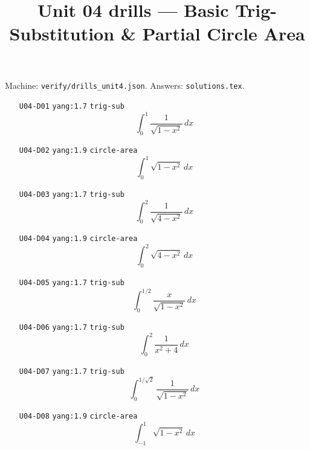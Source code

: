 
\title{Unit 04 drills --- Basic Trig-Substitution \& Partial Circle Area}
\author{}
\date{}

\maketitle
\noindent Machine: \texttt{verify/drills\_unit4.json}. Answers: \texttt{solutions.tex}.
\begin{enumerate}
\item[\texttt{U04-D01}] \texttt{yang:1.7} \texttt{trig-sub}
\[ \int_0^1 \frac{1}{\sqrt{1-x^2}}\,dx \]
\item[\texttt{U04-D02}] \texttt{yang:1.9} \texttt{circle-area}
\[ \int_0^1 \sqrt{1-x^2}\,dx \]
\item[\texttt{U04-D03}] \texttt{yang:1.7} \texttt{trig-sub}
\[ \int_0^2 \frac{1}{\sqrt{4-x^2}}\,dx \]
\item[\texttt{U04-D04}] \texttt{yang:1.9} \texttt{circle-area}
\[ \int_0^2 \sqrt{4-x^2}\,dx \]
\item[\texttt{U04-D05}] \texttt{yang:1.7} \texttt{trig-sub}
\[ \int_0^{1/2} \frac{x}{\sqrt{1-x^2}}\,dx \]
\item[\texttt{U04-D06}] \texttt{yang:1.7} \texttt{trig-sub}
\[ \int_0^2 \frac{1}{x^2+4}\,dx \]
\item[\texttt{U04-D07}] \texttt{yang:1.7} \texttt{trig-sub}
\[ \int_0^{1/\sqrt{2}} \frac{1}{\sqrt{1-x^2}}\,dx \]
\item[\texttt{U04-D08}] \texttt{yang:1.9} \texttt{circle-area}
\[ \int_{-1}^{1} \sqrt{1-x^2}\,dx \]
\end{enumerate}

